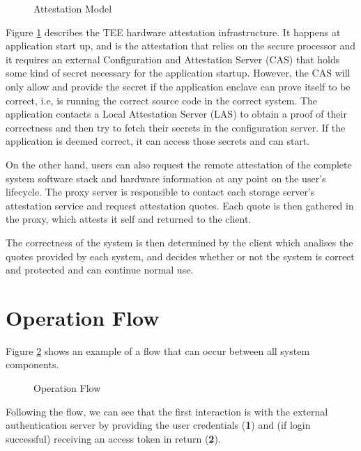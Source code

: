 \begin{figure}[htbp]
  \caption{Attestation Model}
  \label{fig:attestation_model}
\end{figure}

Figure \ref{fig:attestation_model} describes the \gls{TEE} hardware attestation infrastructure. It happens at application start up, and is the attestation that relies on the secure processor and it requires an external Configuration and Attestation Server (\gls{CAS}) that holds some kind of secret necessary for the application startup. However, the \gls{CAS} will only allow and provide the secret if the application enclave can prove itself to be correct, i.e, is running the correct source code in the correct system. The application contacts a Local Attestation Server (\gls{LAS}) to obtain a proof of their correctness and then try to fetch their secrets in the configuration server. If the application is deemed correct, it can access those secrets and can start.

On the other hand, users can also request the remote attestation of the complete system software stack and hardware information at any point on the user's lifecycle. The proxy server is responsible to contact each storage server's attestation service and request attestation quotes. Each quote is then gathered in the proxy, which attests it self and returned to the client.

The correctness of the system is then determined by the client which analises the quotes provided by each system, and decides whether or not the system is correct and protected and can continue normal use.

\section{Operation Flow}
\label{sec:operation_flow}

Figure \ref{fig:operation_flow} shows an example of a flow that can occur between all system components.

\begin{figure}[htbp]
  \caption{Operation Flow}
  \label{fig:operation_flow}
\end{figure}

Following the flow, we can see that the first interaction is with the external authentication server by providing the user credentials (\textbf{1}) and (if login successful) receiving an access token in return (\textbf{2}). 

